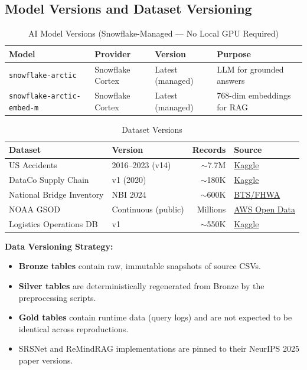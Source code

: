 \documentclass[14.5pt,letterpaper]{article}
\begin{document}
\subsection{Model Versions and Dataset Versioning}

\begin{table}[H]
\centering
\caption{AI Model Versions (Snowflake-Managed --- No Local GPU Required)}
\begin{tabular}{@{}llll@{}}
\toprule
\textbf{Model} & \textbf{Provider} & \textbf{Version} & \textbf{Purpose} \\
\midrule
\texttt{snowflake-arctic} & Snowflake Cortex & Latest (managed) & LLM for grounded answers \\
\texttt{snowflake-arctic-embed-m} & Snowflake Cortex & Latest (managed) & 768-dim embeddings for RAG \\
\bottomrule
\end{tabular}
\end{table}

\begin{table}[H]
\centering
\caption{Dataset Versions}
\small
\begin{tabular}{@{}llrl@{}}
\toprule
\textbf{Dataset} & \textbf{Version} & \textbf{Records} & \textbf{Source} \\
\midrule
US Accidents & 2016--2023 (v14) & $\sim$7.7M & \href{https://www.kaggle.com/datasets/sobhanmoosavi/us-accidents}{Kaggle} \\
DataCo Supply Chain & v1 (2020) & $\sim$180K & \href{https://www.kaggle.com/datasets/shashwatwork/dataco-smart-supply-chain-for-big-data-analysis}{Kaggle} \\
National Bridge Inventory & NBI 2024 & $\sim$600K & \href{https://geodata.bts.gov/datasets/national-bridge-inventory/}{BTS/FHWA} \\
NOAA GSOD & Continuous (public) & Millions & \href{https://registry.opendata.aws/noaa-gsod/}{AWS Open Data} \\
Logistics Operations DB & v1 & $\sim$550K & \href{https://www.kaggle.com/datasets/yogape/logistics-operations-database}{Kaggle} \\
\bottomrule
\end{tabular}
\end{table}

\textbf{Data Versioning Strategy:}
\begin{itemize}
    \item \textbf{Bronze tables} contain raw, immutable snapshots of source CSVs.
    \item \textbf{Silver tables} are deterministically regenerated from Bronze by the preprocessing scripts.
    \item \textbf{Gold tables} contain runtime data (query logs) and are not expected to be identical across reproductions.
    \item SRSNet and ReMindRAG implementations are pinned to their NeurIPS 2025 paper versions.
\end{itemize}
\end{document}
